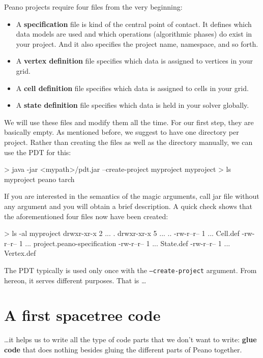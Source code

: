 Peano projects require four files from the very beginning:

\begin{itemize}
  \item A {\bf specification} file is kind of the central point of contact. It
  defines which data models are used and which operations (algorithmic phases)
  do exist in your project. And it also specifies the project name, namespace,
  and so forth.
  \item A {\bf vertex definition} file specifies which data is assigned to
  vertices in your grid.
  \item A {\bf cell definition} file specifies which data is assigned to
  cells in your grid.
  \item A {\bf state definition} file specifies which data is held in your
  solver globally.
\end{itemize}


\noindent
We will use these files and modify them all the time. For our first step, they
are basically empty.
As mentioned before, we suggest to have one directory per project.
Rather than creating the files as well as the directory manually, we can use the
PDT for this:

\begin{code}
> java -jar <mypath>/pdt.jar  --create-project myproject myproject 
> ls
  myproject  peano  tarch
\end{code}

\noindent
If you are interested in the semantics of the magic arguments, call jar file
without any argument and you will obtain a brief description.
A quick check shows that the aforementioned four files now have been created:


\begin{code}
> ls -al myproject
drwxr-xr-x 2 ...  .
drwxr-xr-x 5 ...  ..
-rw-r--r-- 1 ...  Cell.def
-rw-r--r-- 1 ...  project.peano-specification
-rw-r--r-- 1 ...  State.def
-rw-r--r-- 1 ...  Vertex.def
\end{code}

\noindent
The PDT typically is used only once with the \texttt{--create-project} argument.
From hereon, it serves different purposes. 
That is \ldots




\section{A first spacetree code}

\ldots it helps us to write all the type of code parts that we don't want to
write: {\bf glue code} that does nothing besides gluing the different parts of
Peano together.

